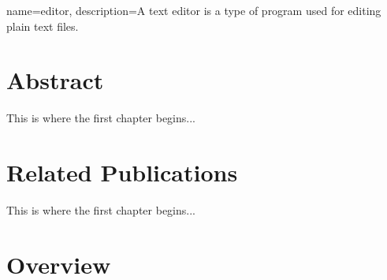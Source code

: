 
{
	name={editor},
	description={A text editor is a type of program used for editing plain text files.}
}

\chapter{Abstract}

This is where the first chapter begins...

\chapter{Related Publications}

This is where the first chapter begins...

\chapter{Overview}


